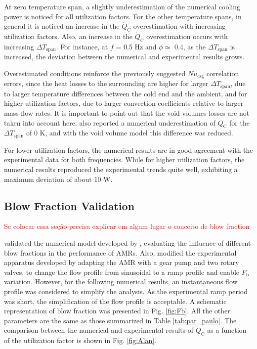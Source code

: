 \documentclass[review,preprint,12pt]{elsarticle}
\begin{document}
At zero temperature span, a slightly underestimation of the numerical cooling power is noticed for all utilization factors. For the other temperature spans, in general it is noticed an increase in the $\dot{Q}_\textrm{C}$ overestimation with increasing utilization factors. Also, an increase in the $\dot{Q}_\textrm{C}$ overestimation occurs with increasing $\Delta T_\textrm{span}$. For instance, at $f$ = 0.5 Hz and $\phi \simeq$ 0.4, as the $\Delta T_\textrm{span}$ is increased, the deviation between the numerical and experimental results grows.

Overestimated conditions reinforce the previously suggested $Nu_\textrm{csg}$ correlation errors, since the heat losses to the surrounding are higher for larger $\Delta T_\textrm{span}$, due to larger temperature differences between the cold end and the ambient, and for higher utilization factors, due to larger convection coefficients relative to larger mass flow rates. It is important to point out that the void volumes losses are not taken into account here. \cite{Trevizoli2015} also reported a numerical underestimation of $\dot{Q}_\textrm{C}$ for the $\Delta T_\textrm{span}$ of 0 K, and with the void volume model this difference was reduced.

For lower utilization factors, the numerical results are in good agreement with the experimental data for both frequencies. While for higher utilization factors, the numerical results reproduced the experimental trends quite well, exhibiting a maximum deviation of about 10 W.

\subsection{Blow Fraction Validation}

\textcolor{red}{Se colocar essa seção precisa explicar em algum lugar o conceito de blow fraction}


\cite{Nakashima2017} validated the numerical model developed by \cite{Trevizoli2015}, evaluating the influence of different blow fractions in the performance of AMRs. Also, \cite{Nakashima2017} modified the experimental apparatus developed by \cite{Trevizoli2015} adapting the AMR with a gear pump and two rotary valves, to change the flow profile from sinusoidal to a ramp profile and enable $F_\textrm{b}$ variation. However, for the following numerical results, an instantaneous flow profile was considered to simplify the analysis. As the experimental ramp period was short, the simplification of the flow profile is acceptable. A schematic representation of blow fraction was presented in Fig. \ref{fig:Fb}. All the other parameters are the same as those summarized in Table \ref{tab:par_paulo}. The comparison between the numerical and experimental results of $\dot{Q}_\textrm{C}$ as a function of the utilization factor is shown in Fig. \ref{fig:Alan}.
\end{document}
